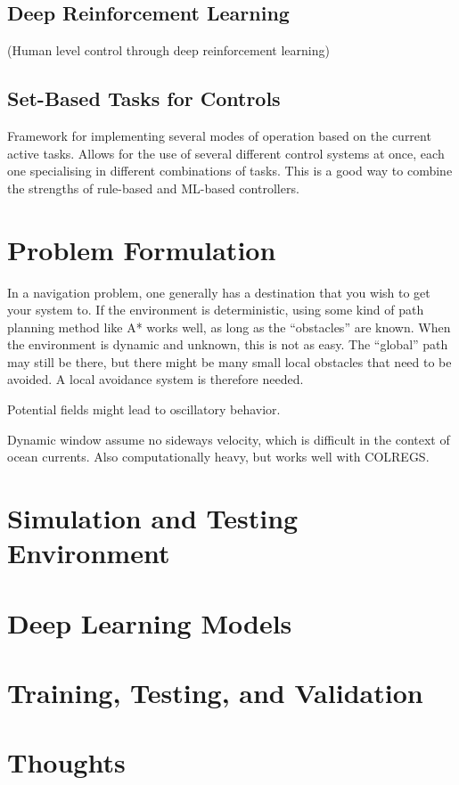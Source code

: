 \documentclass[titlepage]{elsarticle}
\begin{document}
\subsection{Deep Reinforcement Learning}
\label{sec:lit-dl}
(Human level control through deep reinforcement learning)

\subsection{Set-Based Tasks for Controls}
\label{sec:lit-set-tasks}
Framework for implementing several modes of operation based on the
current active tasks. Allows for the use of several different control
systems at once, each one specialising in different combinations of
tasks. This is a good way to combine the strengths of rule-based and
ML-based controllers.



\section{Problem Formulation}
\label{sec:formulation}
In a navigation problem, one generally has a destination that you wish
to get your system to. If the environment is deterministic, using
some kind of path planning method like A* works well, as long as the
``obstacles'' are known. When the environment is dynamic and unknown,
this is not as easy. The ``global'' path may still be there, but there
might be many small local obstacles that need to be avoided. A local
avoidance system is therefore needed.

Potential fields might lead to oscillatory behavior.

Dynamic window assume no sideways velocity, which is difficult in the
context of ocean currents. Also computationally heavy, but works well
with COLREGS.



\section{Simulation and Testing Environment}
\label{sec:sim+test}



\section{Deep Learning Models}
\label{sec:learning-models}



\section{Training, Testing, and Validation}

\label{sec:training}


\section{Thoughts}

\end{document}
